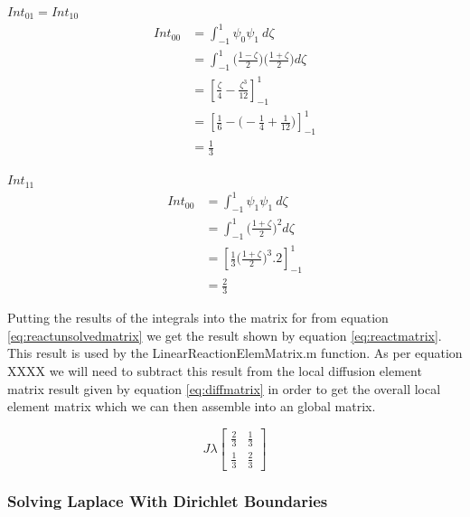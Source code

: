 \documentclass[11pt]{article}
\begin{document}
\underline{$Int_{01} = Int_{10}$} \\

\begin{equation}\label{eq:Int01}
\begin{split}
 Int_{00} &= \int_{-1}^{1} \psi_{0}\psi_{1} \ d \zeta \\
&=  \int_{-1}^{1}  \Big ( \frac{1-\zeta}{2} \Big )  \Big ( \frac{1+\zeta}{2} \Big )d\zeta \\
& = \left[ \frac{\zeta}{4} - \frac{\zeta^3}{12}\right]_{-1}^{1} \\
& = \left[ \frac{1}{6} -  \Big (-\frac{1}{4} + \frac{1}{12} \Big )\right]_{-1}^{1} \\
& = \frac{1}{3}
\end{split}
\end{equation}

\underline{$Int_{11}$} \\
\begin{equation}\label{eq:Int00}
\begin{split}
 Int_{00} &= \int_{-1}^{1} \psi_{1}\psi_{1} \ d \zeta \\
&=  \int_{-1}^{1}  \Big ( \frac{1+\zeta}{2} \Big )^2 d\zeta \\
& = \left[ \frac{1}{3} \Big ( \frac{1+\zeta}{2}\Big)^3 . 2 \right]_{-1}^{1} \\
& = \frac{2}{3}
\end{split}
\end{equation}

Putting the results of the integrals into the matrix for from equation \ref{eq:reactunsolvedmatrix} we get the result shown by equation \ref{eq:reactmatrix}. This result is used by the LinearReactionElemMatrix.m function. As per equation XXXX we will need to subtract this result from the local diffusion element matrix result given by equation \ref{eq:diffmatrix} in order to get the overall local element matrix which we can then assemble into an global matrix.

\begin{equation} \label{eq:reactmatrix}
J\lambda
\begin{bmatrix}

\frac{2}{3} & \frac{1}{3}  \\[1ex]
 \frac{1}{3}  & \frac{2}{3}
\end{bmatrix}
\end{equation}

\subsubsection{Solving Laplace With Dirichlet Boundaries}
\end{document}
